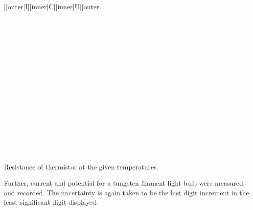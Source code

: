 \begin{paper}
{\begin{papertable}{|[outer]I|[inner]C|[inner]U|[outer]}
			\papertableindex{}\\\paperiline
			\papertableindex{}\\\paperiline
			\papertableindex{}\\\paperiline
			\papertableindex{}\\\paperiline
			\papertableindex{}\\\paperiline
			\papertableindex{}\\\paperiline
			\papertableindex{}\\\paperiline
			\papertableindex{}\\\paperiline
			\papertableindex{}\\\paperiline
			\papertableindex{}\\\paperiline
			\papertableindex{}\\\paperiline
			\papertableindex{}\\\paperiline
			\papertableindex{}\\\paperiline
			\papertableindex{}\\\paperiline
			\papertableindex{}\\\paperiline
			\papertableindex{}\\\paperoline
		\end{papertable}\vspace{-1.5em}}
	{Resistance of thermistor at the given temperatures.}\vspace{1em}

	Further, current and potential for a tungsten filament light bulb were measured and recorded. The uncertainty is again taken to be the last digit increment in the least significant digit displayed. 


\end{paper}
